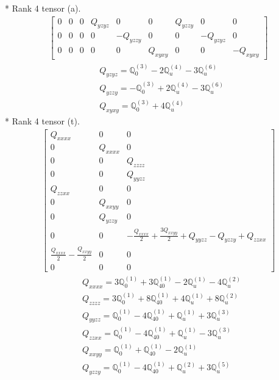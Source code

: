 \documentclass[fleqn,8pt,landscape]{jsarticle}
\begin{document}
* Rank 4 tensor (a).
\begin{align*}
\begin{bmatrix} 0 & 0 & 0 & Q_{yzyz} & 0 & 0 & Q_{yzzy} & 0 & 0 \\ 0 & 0 & 0 & 0 & - Q_{yzzy} & 0 & 0 & - Q_{yzyz} & 0 \\ 0 & 0 & 0 & 0 & 0 & Q_{xyxy} & 0 & 0 & - Q_{xyxy} \end{bmatrix}
\end{align*}
\begin{align*}
& Q_{yzyz} = \mathbb{Q}_{0}^{(3)} - 2 \mathbb{Q}_{u}^{(4)} - 3 \mathbb{Q}_{u}^{(6)} \\
& Q_{yzzy} = - \mathbb{Q}_{0}^{(3)} + 2 \mathbb{Q}_{u}^{(4)} - 3 \mathbb{Q}_{u}^{(6)} \\
& Q_{xyxy} = \mathbb{Q}_{0}^{(3)} + 4 \mathbb{Q}_{u}^{(4)}
\end{align*}
* Rank 4 tensor (t).
\begin{align*}
\begin{bmatrix} Q_{xxxx} & 0 & 0 \\ 0 & Q_{xxxx} & 0 \\ 0 & 0 & Q_{zzzz} \\ 0 & 0 & Q_{yyzz} \\ Q_{zzxx} & 0 & 0 \\ 0 & Q_{xxyy} & 0 \\ 0 & Q_{yzzy} & 0 \\ 0 & 0 & - \frac{Q_{xxxx}}{2} + \frac{3 Q_{xxyy}}{2} + Q_{yyzz} - Q_{yzzy} + Q_{zzxx} \\ \frac{Q_{xxxx}}{2} - \frac{Q_{xxyy}}{2} & 0 & 0 \\ 0 & 0 & 0 \end{bmatrix}
\end{align*}
\begin{align*}
& Q_{xxxx} = 3 \mathbb{Q}_{0}^{(1)} + 3 \mathbb{Q}_{40}^{(1)} - 2 \mathbb{Q}_{u}^{(1)} - 4 \mathbb{Q}_{u}^{(2)} \\
& Q_{zzzz} = 3 \mathbb{Q}_{0}^{(1)} + 8 \mathbb{Q}_{40}^{(1)} + 4 \mathbb{Q}_{u}^{(1)} + 8 \mathbb{Q}_{u}^{(2)} \\
& Q_{yyzz} = \mathbb{Q}_{0}^{(1)} - 4 \mathbb{Q}_{40}^{(1)} + \mathbb{Q}_{u}^{(1)} + 3 \mathbb{Q}_{u}^{(3)} \\
& Q_{zzxx} = \mathbb{Q}_{0}^{(1)} - 4 \mathbb{Q}_{40}^{(1)} + \mathbb{Q}_{u}^{(1)} - 3 \mathbb{Q}_{u}^{(3)} \\
& Q_{xxyy} = \mathbb{Q}_{0}^{(1)} + \mathbb{Q}_{40}^{(1)} - 2 \mathbb{Q}_{u}^{(1)} \\
& Q_{yzzy} = \mathbb{Q}_{0}^{(1)} - 4 \mathbb{Q}_{40}^{(1)} + \mathbb{Q}_{u}^{(2)} + 3 \mathbb{Q}_{u}^{(5)}
\end{align*}
\end{document}
